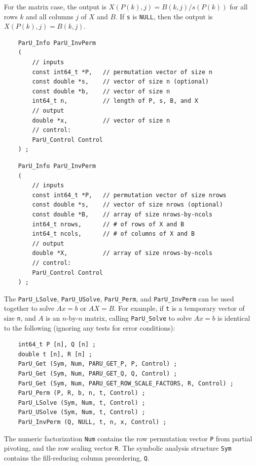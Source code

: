 \documentclass[12pt]{article}
\begin{document}
    For the matrix case, the output is $X(P(k),j) = B(k,j) / s(P(k))$ for all
    rows $k$ and all columns $j$ of $X$ and $B$.  If \verb's' is \verb'NULL',
    then the output is $X(P(k),j) = B(k,j)$.

    {\footnotesize
    \begin{verbatim}
    ParU_Info ParU_InvPerm
    (
        // inputs
        const int64_t *P,   // permutation vector of size n
        const double *s,    // vector of size n (optional)
        const double *b,    // vector of size n
        int64_t n,          // length of P, s, B, and X
        // output
        double *x,          // vector of size n
        // control:
        ParU_Control Control
    ) ; \end{verbatim} }

    {\footnotesize
    \begin{verbatim}
    ParU_Info ParU_InvPerm
    (
        // inputs
        const int64_t *P,   // permutation vector of size nrows
        const double *s,    // vector of size nrows (optional)
        const double *B,    // array of size nrows-by-ncols
        int64_t nrows,      // # of rows of X and B
        int64_t ncols,      // # of columns of X and B
        // output
        double *X,          // array of size nrows-by-ncols
        // control:
        ParU_Control Control
    ) ; \end{verbatim} }

    The \verb'ParU_LSolve', \verb'ParU_USolve', \verb'ParU_Perm', and
    \verb'ParU_InvPerm' can be used together to solve $Ax=b$ or $AX=B$.  For
    example, if \verb't' is a temporary vector of size \verb'n', and $A$ is an
    $n$-by-$n$ matrix, calling \verb'ParU_Solve' to solve $Ax=b$ is identical
    to the following (ignoring any tests for error conditions):

    {\footnotesize
    \begin{verbatim}
    int64_t P [n], Q [n] ;
    double t [n], R [n] ;
    ParU_Get (Sym, Num, PARU_GET_P, P, Control) ;
    ParU_Get (Sym, Num, PARU_GET_Q, Q, Control) ;
    ParU_Get (Sym, Num, PARU_GET_ROW_SCALE_FACTORS, R, Control) ;
    ParU_Perm (P, R, b, n, t, Control) ;
    ParU_LSolve (Sym, Num, t, Control) ;
    ParU_USolve (Sym, Num, t, Control) ;
    ParU_InvPerm (Q, NULL, t, n, x, Control) ; \end{verbatim} }

    The numeric factorization \verb'Num' contains the row permutation vector
    \verb'P' from partial pivoting, and the row scaling vector
    \verb'R'.  The symbolic analysis structure \verb'Sym' contains the
    fill-reducing column preordering, \verb'Q'.
\end{document}
